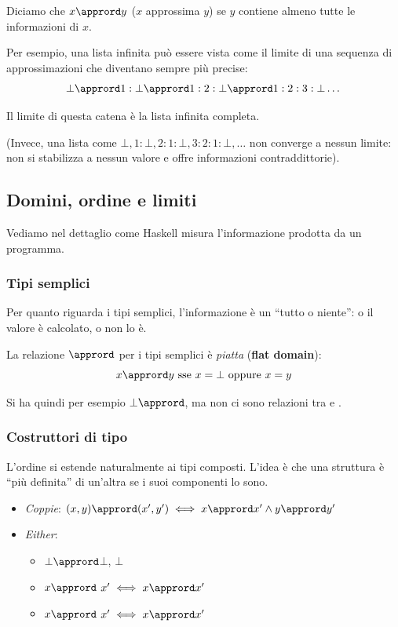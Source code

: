 Diciamo che $x \apprord y$ ($x$ approssima $y$) se $y$ contiene almeno tutte le informazioni di $x$.

Per esempio, una lista infinita \code{[1..]} può essere vista come il limite di una sequenza di approssimazioni che diventano sempre più precise:
$$\bot \apprord 1:\bot \apprord 1:2:\bot \apprord 1:2:3:\bot \dots $$

Il limite di questa catena è la lista infinita completa.

(Invece, una lista come $\bot, 1 : \bot, 2 : 1: \bot, 3 : 2 : 1 : \bot, \dots$ non converge a nessun limite: non si stabilizza a nessun valore e offre informazioni contraddittorie).

\subsection{Domini, ordine e limiti}
Vediamo nel dettaglio come Haskell misura l'informazione prodotta da un programma.

\subsubsection{Tipi semplici}
Per quanto riguarda i tipi semplici, l'informazione è un ``tutto o niente'': o il valore è calcolato, o non lo è.

La relazione $\apprord$ per i tipi semplici è \textit{piatta} (\textbf{flat domain}): 
$$x \apprord y \text{ sse } x = \bot \text{ oppure } x = y$$

Si ha quindi per esempio $\bot \apprord$, ma non ci sono relazioni tra  e .

\subsubsection{Costruttori di tipo}
L'ordine si estende naturalmente ai tipi composti. L'idea è che una struttura è ``più definita'' di un'altra se i suoi componenti lo sono.

\begin{itemize}
    \item \textit{Coppie}: $(x, y) \apprord (x', y') \iff x \apprord x' \land y \apprord y'$
    \item \textit{Either}: 
        \begin{itemize}
            \item $\bot \apprord$$\bot$, $\bot$
            \item {}$x \apprord$  $x' \iff x \apprord x'$
            \item {}$x \apprord$  $x' \iff x \apprord x'$
        \end{itemize}
\end{itemize}

